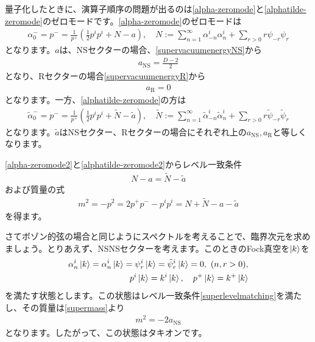 \documentclass[report,paper=a4, fontsize=12pt, line_length=16cm, number_of_lines=33,dvipdfmx]{jlreq}
\numberwithin{equation}{chapter}
\numberwithin{equation}{section}
\newcommand{\alphat}{\tilde{\alpha}}
\newcommand{\Nt}{\widetilde{N}}
\newcommand{\at}{\tilde{a}}
\newcommand{\psit}{\tilde{\psi}}
\newcommand{\aNS}{a_{\mathrm{NS}}}
\newcommand{\aR}{a_{\mathrm{R}}}
\begin{document}
量子化したときに、演算子順序の問題が出るのは\eqref{alpha-zeromode}と\eqref{alphatilde-zeromode}のゼロモードです。\eqref{alpha-zeromode}のゼロモードは
\begin{align}
  \alpha^{-}_{0}=p^{-}=\frac{1}{p^{+}}\left(\frac12 p^{i}p^{i}+N-a  \right),\quad N:=\sum_{n=1}^{\infty}\alpha_{-n}^{i}\alpha_{n}^{i}+\sum_{r>0}r\psi_{-r}\psi_{r}\label{alpha-zeromode2}
\end{align}
となります。$a$は、NSセクターの場合、\eqref{supervacuumenergyNS}から
\begin{align}
  \aNS=\frac{D-2}{2}
\end{align}
となり、Rセクターの場合\eqref{supervacuumenergyR}から
\begin{align}
  \aR=0
\end{align}
となります。一方、\eqref{alphatilde-zeromode}の方は
\begin{align}
  \alphat^{-}_{0}=p^{-}=\frac{1}{p^{+}}\left(\frac12 p^{i}p^{i}+\Nt-\at  \right),\quad \Nt:=\sum_{n=1}^{\infty}\alphat_{-n}^{i}\alphat_{n}^{i}+\sum_{r>0}r\psit_{-r}\psit_{r}\label{alphatilde-zeromode2}
\end{align}
となります。$\at$はNSセクター、Rセクターの場合にそれぞれ上の$\aNS,\aR$と等しくなります。

\eqref{alpha-zeromode2}と\eqref{alphatilde-zeromode2}からレベル一致条件
\begin{align}
  N-a=\Nt-\at\label{superlevelmatching}
\end{align}
および質量の式
\begin{align}
  m^2=-p^2=2p^{+}p^{-}-p^{i}p^{i}=N+\Nt-a-\at\label{supermass}
\end{align}
を得ます。

さてボゾン的弦の場合と同じようにスペクトルを考えることで、臨界次元を求めましょう。とりあえず、NSNSセクターを考えます。このときのFock真空を$\ket{k}$を
\begin{align}
  \alpha_{n}^{i}\ket{k}=\alpha_{n}^{i}\ket{k}=\psi_{r}^{i}\ket{k}=\psit_{r}^{i}\ket{k}=0,\ (n,r>0),\nonumber\\
  p^{i}\ket{k}=k^i\ket{k},\quad p^{+}\ket{k}=k^{+}\ket{k}
\end{align}
を満たす状態とします。この状態はレベル一致条件\eqref{superlevelmatching}を満たし、その質量は\eqref{supermass}より
\begin{align}
  m^2=-2\aNS
\end{align}
となります。したがって、この状態はタキオンです。
\end{document}
